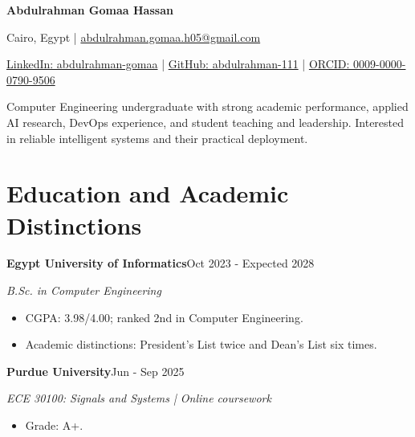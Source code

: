 \documentclass[10pt,a4paper]{article}
\newcommand{\cvitem}[3]{\par\addvspace{4pt}\textbf{#1}\hfill{\small #3}\par{\small\textit{#2}}\par}
\begin{document}
{\LARGE\bfseries Abdulrahman Gomaa Hassan}\par
Cairo, Egypt \enspace | \enspace \href{mailto:abdulrahman.gomaa.h05@gmail.com}{abdulrahman.gomaa.h05@gmail.com}\par
\href{https://www.linkedin.com/in/abdulrahman-gomaa}{LinkedIn: abdulrahman-gomaa} \enspace | \enspace \href{https://github.com/abdulrahman-111}{GitHub: abdulrahman-111} \enspace | \enspace \href{https://orcid.org/0009-0000-0790-9506}{ORCID: 0009-0000-0790-9506}\par
Computer Engineering undergraduate with strong academic performance, applied AI research, DevOps experience, and student teaching and leadership. Interested in reliable intelligent systems and their practical deployment.\par
\section*{Education and Academic Distinctions}
\cvitem{Egypt University of Informatics}{B.Sc. in Computer Engineering}{Oct 2023 - Expected 2028}
\begin{itemize}
\item CGPA: 3.98/4.00; ranked 2nd in Computer Engineering.
\item Academic distinctions: President's List twice and Dean's List six times.
\end{itemize}
\cvitem{Purdue University}{ECE 30100: Signals and Systems | Online coursework}{Jun - Sep 2025}
\begin{itemize}
\item Grade: A+.
\end{itemize}
\end{document}
